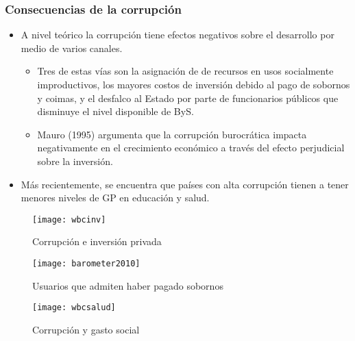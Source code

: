 \documentclass[handout,final,xcolor=dvipsnames]{beamer}
\begin{document}
\begin{frame}\frametitle{Consecuencias de la corrupción}
\begin{itemize}\itemsep 10pt
\item A nivel teórico la corrupción tiene efectos
  negativos sobre el desarrollo por medio de varios canales. 
\begin{itemize} \itemsep 10pt
\item  Tres de estas vías son la asignación de de recursos en usos socialmente improductivos, los mayores costos de inversión debido al pago de sobornos y coimas, y el desfalco al Estado por parte de funcionarios públicos que disminuye el nivel disponible de ByS. 
\item Mauro (1995)  argumenta que la corrupción
  burocrática impacta negativamente en el crecimiento económico a
  través del efecto perjudicial sobre la inversión.
\end{itemize}
\item Más recientemente, se encuentra que países con alta corrupción
  tienen a tener menores niveles de GP en educación y salud. 
\end{itemize}
\end{frame}


\begin{frame}
\begin{figure}[htbp]
    \centering
    \texttt{[image: wbcinv]}
    \caption{Corrupción e inversión privada}
    \label{fig:corruptgastosocial}
  \end{figure}
\end{frame}





\begin{frame}
\begin{figure}[htbp]
    \centering
    \texttt{[image: barometer2010]}
    \caption{Usuarios que admiten haber pagado sobornos}
    \label{fig:corruptsobornos}
  \end{figure}
\end{frame}



\begin{frame}
\begin{figure}[htbp]
    \centering
    \texttt{[image: wbcsalud]}
    \caption{Corrupción y gasto social}
    \label{fig:corruptgastosocial}
  \end{figure}
\end{frame}
\end{document}
